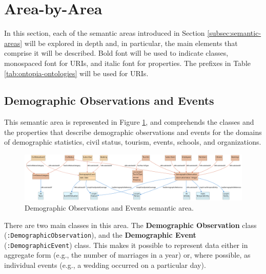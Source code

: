 \section{Area-by-Area}
\label{sec:area-by-area}

In this section, each of the semantic areas introduced in Section \ref{subsec:semantic-areas} will be explored in depth and, in particular, the main elements that comprise it will be described. Bold font will be used to indicate classes, monospaced font for \acp{URI}, and italic font for properties. The prefixes in Table \ref{tab:ontopia-ontologies} will be used for \acp{URI}.

\subsection{Demographic Observations and Events}
\label{subsec:demographic-observations}

This semantic area is represented in Figure \ref{fig:demographic-sa}, and comprehends the classes and the properties that describe demographic observations and events for the domains of demographic statistics, civil status, tourism, events, schools, and organizations.

\begin{figure}
  \centering
  \includegraphics[width=\columnwidth]{images/ontoim/demographic}
  \caption{Demographic Observations and Events semantic area.}
  \label{fig:demographic-sa}
\end{figure}

There are two main classes in this area. The \textbf{Demographic Observation} class (\verb#:DemographicObservation#), and the \textbf{Demographic Event} (\verb#:DemographicEvent#) class. This makes it possible to represent data either in aggregate form (e.g., the number of marriages in a year) or, where possible, as individual events (e.g., a wedding occurred on a particular day).

